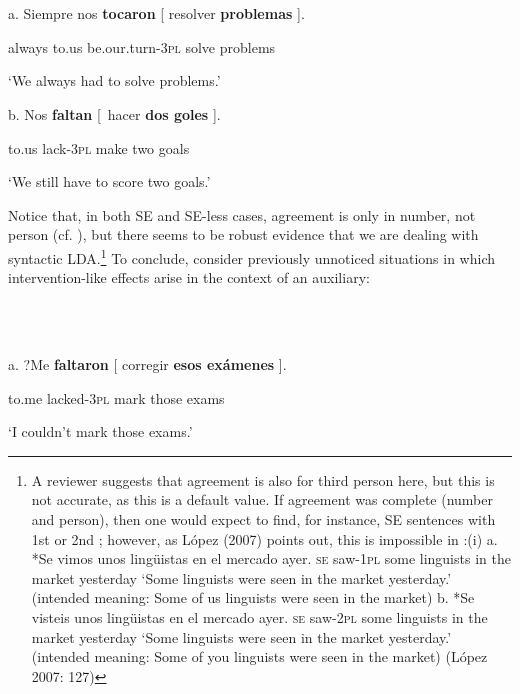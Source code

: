 \documentclass[output=paper]{langsci/langscibook}
\begin{document}
\ea%
    \label{ex:key:11}
    \gll\\
        \\
    \glt
    \z

            a.  Siempre   nos    \textbf{tocaron}              [ resolver  \textbf{problemas} ].

       always    to.us  be.our.turn-\textsc{3pl}  solve       problems

            ‘We always had to solve problems.’

    b.   Nos   \textbf{faltan}    [~hacer  \textbf{dos  goles} ].

        to.us  lack-\textsc{3pl}   make two goals

        ‘We still have to score two goals.’

Notice that, in both SE and SE-less cases, agreement is only in number, not person (cf. \citealt{Etxepare2005}), but there seems to be robust evidence that we are dealing with syntactic LDA.\footnote{A reviewer suggests that agreement is also for third person here, but this is not accurate, as this is a default value. If agreement was complete (number and person), then one would expect to find, for instance, SE sentences with 1st or 2nd ; however, as López (2007) points out, this is impossible in :(i)  a.  *Se  vimos      unos  lingüistas en  el   mercado ayer.            \textsc{se}     saw-\textsc{1pl}  some linguists   in  the market    yesterday    ‘Some linguists were seen in the market yesterday.’      (intended meaning: Some of us linguists were seen in the market)  b.  *Se  visteis      unos  lingüistas en  el    mercado  ayer.          \textsc{se}  saw-\textsc{2pl}  some linguists   in  the  market     yesterday          ‘Some linguists were seen in the market yesterday.’     (intended meaning: Some of you linguists were seen in the market)    (López 2007: 127)} To conclude, consider previously unnoticed situations in which intervention-like effects arise in the context of an auxiliary: 

\ea%
    \label{ex:key:12}
    \gll\\
        \\
    \glt
    \z

          a.  ?Me       \textbf{faltaron}      [ corregir \textbf{esos   exámenes} ].

          to.me   lacked-\textsc{3pl}   mark      those exams

          ‘I couldn’t mark those exams.’
\end{document}
